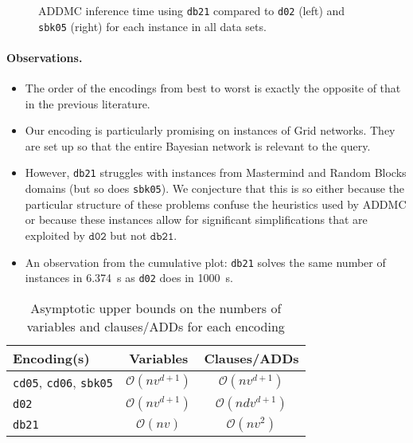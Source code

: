 \documentclass[letterpaper]{article} %
\theoremstyle{definition}
\theoremstyle{remark}
\begin{document}
{\begin{figure*}
  \centering
  \caption{ADDMC inference time using \texttt{db21} compared to \texttt{d02}
    (left) and \texttt{sbk05} (right) for each instance in all data sets.}
\end{figure*}

\paragraph{Observations.}
\begin{itemize}
\item The order of the encodings from best to worst is exactly the opposite of
  that in the previous literature.
\item Our encoding is particularly promising on instances of Grid networks.
  They are set up so that the entire Bayesian network is relevant to the
  query.
\item However, \texttt{db21} struggles with instances from Mastermind and
  Random Blocks domains (but so does \texttt{sbk05}). We conjecture that this
  is so either because the particular structure of these problems confuse the
  heuristics used by ADDMC or because these instances allow for significant
  simplifications that are exploited by $\mathtt{d02}$ but not
  $\mathtt{db21}$.
\item An observation from the cumulative plot: \texttt{db21} solves the same
  number of instances in \SI{6.374}{\second} as \texttt{d02} does in
  \SI{1000}{\second}.
\end{itemize}

\begin{table}
  \centering
  \caption{Asymptotic upper bounds on the numbers of variables and clauses/ADDs
    for each encoding}
  \label{tbl:asymptotes}
  \begin{tabular}{lcc}
    \toprule
    Encoding(s) & Variables & Clauses/ADDs \\
    \midrule
    \texttt{cd05}, \texttt{cd06}, \texttt{sbk05} & $\mathcal{O}(nv^{d+1})$ & $\mathcal{O}(nv^{d+1})$ \\
    \texttt{d02} & $\mathcal{O}(nv^{d+1})$ & $\mathcal{O}(ndv^{d+1})$ \\
    \texttt{db21} & $\mathcal{O}(nv)$ & $\mathcal{O}(nv^2)$ \\
    \bottomrule
  \end{tabular}
\end{table}

}
\end{document}
